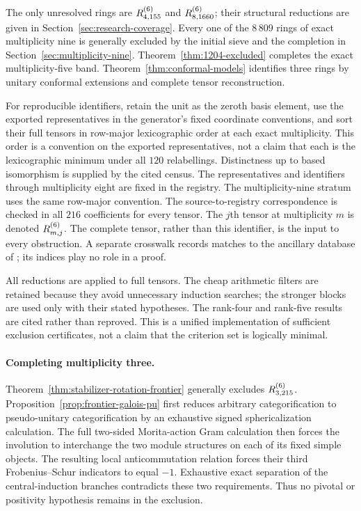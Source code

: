 


The only unresolved rings are $R^{(6)}_{4,155}$ and $R^{(6)}_{8,1660}$;
their structural reductions are given in Section~\ref{sec:research-coverage}.
Every one of the $8\,809$ rings of exact multiplicity nine is generally
excluded by the initial sieve and the completion in
Section~\ref{sec:multiplicity-nine}.
Theorem~\ref{thm:1204-excluded} completes the exact multiplicity-five band. Theorem~\ref{thm:conformal-models}
identifies three rings by unitary conformal
extensions and complete tensor reconstruction.

For reproducible identifiers, retain the unit as the zeroth basis element,
use the exported representatives in the generator's fixed coordinate
conventions, and sort their full tensors in row-major lexicographic order
at each exact multiplicity. This order is a convention on the exported
representatives, not a claim that each is the lexicographic minimum under
all $120$ relabellings. Distinctness up to based isomorphism is supplied
by the cited census.
The representatives and identifiers through multiplicity eight are fixed in the registry. The multiplicity-nine stratum uses the same row-major convention. The source-to-registry correspondence is checked in all $216$ coefficients for every tensor. The $j$th tensor at multiplicity $m$ is denoted
$R^{(6)}_{m,j}$. The complete tensor, rather than this identifier, is the input
to every obstruction. A separate crosswalk records matches to the
ancillary database of \cite{VS}; its indices play no role in a proof.

All reductions are applied to full tensors. The cheap arithmetic filters
are retained because they avoid unnecessary induction searches; the
stronger blocks are used only with their stated hypotheses. The
rank-four and rank-five results are cited rather than reproved. This is
a unified implementation of sufficient exclusion certificates, not a
claim that the criterion set is logically minimal.

\paragraph{Completing multiplicity three.}
Theorem~\ref{thm:stabilizer-rotation-frontier} generally excludes
$R^{(6)}_{3,215}$. Proposition~\ref{prop:frontier-galois-pu} first reduces
arbitrary categorification to pseudo-unitary categorification by an
exhaustive signed sphericalization calculation. The full two-sided
Morita-action Gram calculation then forces the involution to interchange
the two module structures on each of its fixed simple objects. The
resulting local anticommutation relation forces their third
Frobenius--Schur indicators to equal $-1$. Exhaustive exact separation
of the central-induction branches contradicts these two requirements.
Thus no pivotal or positivity hypothesis remains in the exclusion.

